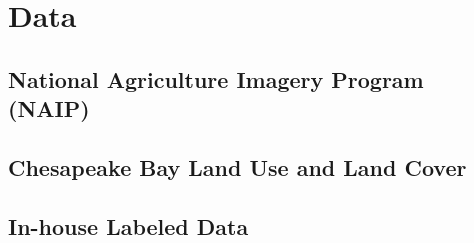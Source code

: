 \section{Data}

\subsection{National Agriculture Imagery Program (NAIP)}

\subsection{Chesapeake Bay Land Use and Land Cover}

\subsection{In-house Labeled Data}

